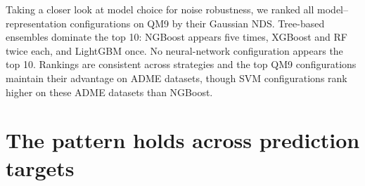 Taking a closer look at model choice for noise robustness, we ranked all model--representation configurations on QM9 by their Gaussian NDS. Tree-based ensembles dominate the top 10: NGBoost appears five times, XGBoost and RF twice each, and LightGBM once. No neural-network configuration appears the top 10. Rankings are consistent across strategies and the top QM9 configurations maintain their advantage on ADME datasets, though SVM configurations rank higher on these ADME datasets than NGBoost.

\section{The pattern holds across prediction targets}
